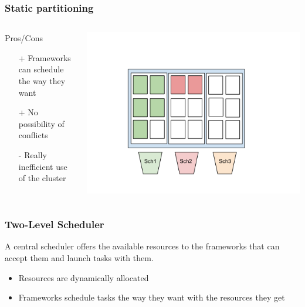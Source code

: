 \documentclass[notes=hide]{beamer}
\begin{document}
  \begin{frame}
    \frametitle{Static partitioning}
       \begin{columns}[T]
       \begin{column}{.5\textwidth}
        \begin{block}{Pros/Cons}

            \begin{itemize}
              \item[+] Frameworks can schedule the way they want 
              \item[+] No possibility of conflicts
              \item[-] Really inefficient use of the cluster
            \end{itemize}
        \end{block}
        \end{column}
        \begin{column}{.6\textwidth}
         \includegraphics[trim = 40mm 30mm 30mm 40mm,clip,scale=0.30,natwidth=960,natheight=720]{StaticPartitioning-slides.png}
        \end{column}
      \end{columns}
  \end{frame}

  \note{}

  \begin{frame}
    \frametitle{Two-Level Scheduler}
    \begin{definition}
      A central scheduler offers the available resources to
      the frameworks that can accept them and launch tasks
      with them.
    \end{definition}
    \begin{itemize}
      \item Resources are dynamically allocated
      \item Frameworks schedule tasks the way they want
        with the resources they get
    \end{itemize}
  \end{frame}
\end{document}
